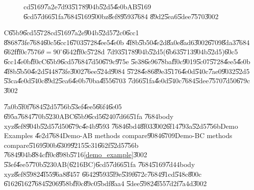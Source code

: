 \begin{figure}[th]
\caption{cd\U{5169}\U{7a2e}\U{7d93}\U{5178}\U{904b}\U{52d5}\U{4e0b}AB\U{5169}%
\U{6cd5}\U{7d66}\U{51fa}\U{7684}\U{5169}\U{500b}z\U{8ef8}\U{9593}\U{7684}%
\U{89d2}\U{5ea6}\U{5dee}\U{7570}\U{3002}}
\begin{center}
\frame{}
\end{center}
\end{figure}

C\U{65b9}\U{6cd5}\U{5728}cd\U{5169}\U{7a2e}\U{904b}\U{52d5}\U{72c0}\U{6cc1}%
\U{8868}\U{73fe}\U{7684}\U{60c5}\U{6cc1}\U{6703}\U{5728}\U{4ee5}\U{4e0b}%
\U{4f8b}\U{5b50}\U{4e2d}\U{8a0e}\U{8ad6}\U{3002}\U{6709}\U{8da3}\U{7684}%
\U{662f}\U{ff0c}\U{7576}$\theta =90^{\circ }$\U{6642}\U{ff0c}\U{5728}d%
\U{7d93}\U{5178}\U{904b}\U{52d5}(\U{6b63}\U{5713}\U{904b}\U{52d5})\U{60c5}%
\U{6cc1}\U{4e0b}\U{ff0c}C\U{65b9}\U{6cd5}\U{7684}\U{7d50}\U{679c}\U{975e}%
\U{5e38}\U{6e96}\U{78ba}\U{ff0c}\U{9019}\U{5c07}\U{5728}\U{4ee5}\U{4e0b}%
\U{4f8b}\U{5b50}\U{4e2d}\U{5448}\U{73fe}\U{3002}\U{76ee}\U{524d}\U{9084}%
\U{5728}\U{4e86}\U{89e3}\U{5176}\U{4e0d}\U{540c}\U{7ae0}\U{9032}\U{52d5}%
\U{53ca}\U{4e0d}\U{540c}\U{89d2}\U{5ea6}\U{4e0b}\U{70ba}\U{4f55}\U{6703}%
\U{7d66}\U{51fa}\U{4e0d}\U{540c}\U{7684}\U{5dee}\U{7570}\U{7d50}\U{679c}%
\U{3002}

\bigskip

\U{7a0b}\U{5f0f}\U{7684}\U{52d5}\U{756b}\U{53ef}\U{4ee5}\U{66f4}\U{6e05}%
\U{695a}\U{7684}\U{770b}\U{5230}ABC\U{65b9}\U{6cd5}\U{6240}\U{7d66}\U{51fa}%
\U{7684}body xyz\U{8ef8}\U{904b}\U{52d5}\U{7d50}\U{679c}\U{4e4b}\U{9593}%
\U{7684}\U{6bd4}\U{8f03}\U{3002}\U{6f14}\U{793a}\U{52d5}\U{756b}Demo Examples%
\U{4e2d}\U{7684}Demo-AB methods compare\U{9084}\U{6709}Demo-BC methods
compare\U{5169}\U{500b}\U{6309}\U{9215}\U{5c31}\U{662f}\U{52d5}\U{756b}%
\U{7684}\U{904b}\U{884c}\U{ff0c}\U{898b}\U{5716}\ref{demo_example}\U{3002}%
\U{53ef}\U{4ee5}\U{770b}\U{5230}AB(\U{6216}BC)\U{6cd5}\U{7d66}\U{51fa}%
\U{7684}\U{5169}\U{7d44}body xyz\U{8ef8}\U{5982}\U{4f55}\U{96a8}\U{8457}%
\U{6642}\U{9593}\U{5f9e}\U{539f}\U{672c}\U{7684}\U{91cd}\U{548c}\U{800c}%
\U{6162}\U{6162}\U{7684}\U{5206}\U{958b}\U{ff0c}\U{89c0}\U{5bdf}\U{8aa4}%
\U{5dee}\U{5982}\U{4f55}\U{7d2f}\U{7a4d}\U{3002}

\clearpage%

